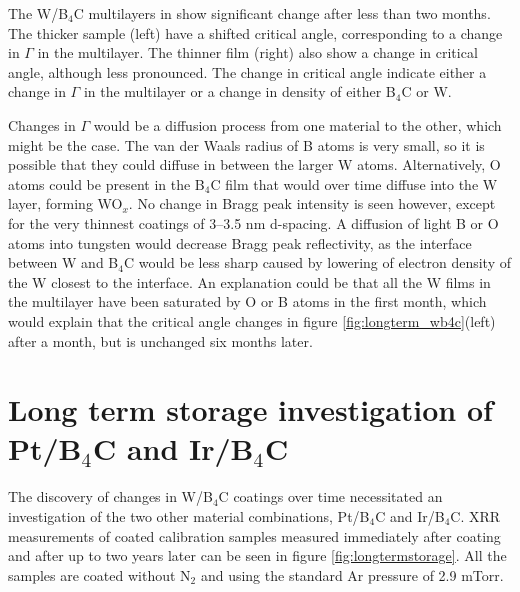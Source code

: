 The W/B$_4$C multilayers in  show significant change after less than two months. The thicker sample (left) have a shifted critical angle, corresponding to a change in $\Gamma$ in the multilayer. The thinner film (right) also show a change in critical angle, although less pronounced. The change in critical angle indicate either a change in $\Gamma$ in the multilayer or a change in density of either B$_4$C or W.

Changes in $\Gamma$ would be a diffusion process from one material to the other, which might be the case. The van der Waals radius of B atoms is very small, so it is possible that they could diffuse in between the larger W atoms. Alternatively, O atoms could be present in the B$_4$C film that would over time diffuse into the W layer\cite{JACOBS:1963dp}, forming WO$_x$. No change in Bragg peak intensity is seen however, except for the very thinnest coatings of 3--3.5 nm d-spacing. A diffusion of light B or O atoms into tungsten would decrease Bragg peak reflectivity, as the interface between W and B$_4$C would be less sharp caused by lowering of electron density of the W closest to the interface. An explanation could be that all the W films in the multilayer have been saturated by O or B atoms in the first month, which would explain that the critical angle changes in figure \ref{fig:longterm_wb4c}(left) after a month, but is unchanged six months later.

\section{Long term storage investigation of Pt/B$_4$C and Ir/B$_4$C}\label{sec:long_term}
The discovery of changes in W/B$_4$C coatings over time necessitated an investigation of the two other material combinations, Pt/B$_4$C and Ir/B$_4$C. XRR measurements of coated calibration samples measured immediately after coating and after up to two years later can be seen in figure \ref{fig:longtermstorage}. All the samples are coated without N$_2$ and using the standard Ar pressure of 2.9 mTorr.

